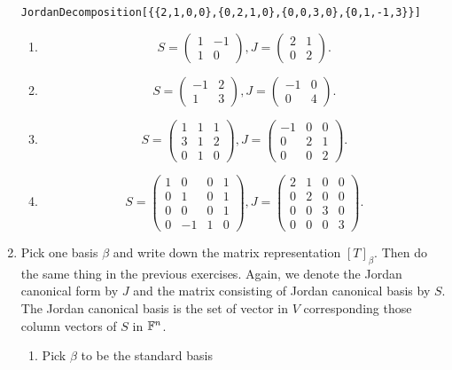 \begin{enumerate}
\begin{verbatim}
JordanDecomposition[{{2,1,0,0},{0,2,1,0},{0,0,3,0},{0,1,-1,3}}]
\end{verbatim}
\begin{enumerate}
\item 
\[S=\begin{pmatrix}1&-1\\1&0\end{pmatrix}, J=\begin{pmatrix}2&1\\0&2\end{pmatrix}.\]
\item 
\[S=\begin{pmatrix}-1&2\\1&3\end{pmatrix}, J=\begin{pmatrix}-1&0\\0&4\end{pmatrix}.\]
\item 
\[S=\begin{pmatrix}1&1&1\\3&1&2\\0&1&0\end{pmatrix}, J=\begin{pmatrix}-1&0&0\\0&2&1\\0&0&2\end{pmatrix}.\]
\item 
\[S=\begin{pmatrix}1&0&0&1\\0&1&0&1\\0&0&0&1\\0&-1&1&0\end{pmatrix}, J=\begin{pmatrix}2&1&0&0\\0&2&0&0\\0&0&3&0\\0&0&0&3\end{pmatrix}.\]
\end{enumerate}
\item Pick one basis $\beta $ and write down the matrix representation $[T]_{\beta}$. Then do the same thing in the previous exercises. Again, we denote the Jordan canonical form by $J$ and the matrix consisting of Jordan canonical basis by $S$. The Jordan canonical basis is the set of vector in $V$ corresponding those column vectors of $S$ in $\mathbb{F}^n$.
\begin{enumerate}
\item Pick $\beta$ to be the standard basis 

\end{enumerate}
\end{enumerate}
